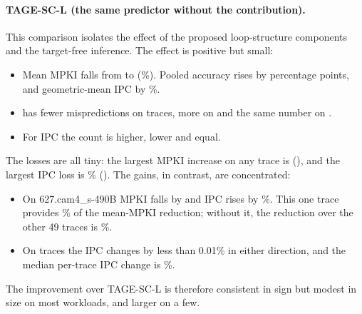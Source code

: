 \paragraph{TAGE-SC-L (the same predictor without the contribution).} This comparison isolates the effect of the proposed loop-structure components and the target-free inference. The effect is positive but small:
\begin{itemize}
\item Mean MPKI falls from  to  (\%). Pooled accuracy rises by  percentage points, and geometric-mean IPC by \%.
\item \prop{} has fewer mispredictions on  traces, more on  and the same number on .
\item For IPC the count is  higher,  lower and  equal.
\end{itemize}
The losses are all tiny: the largest MPKI increase on any trace is  (), and the largest IPC loss is \% (). The gains, in contrast, are concentrated:
\begin{itemize}
\item On 627.cam4\_s-490B MPKI falls by  and IPC rises by \%. This one trace provides \% of the mean-MPKI reduction; without it, the reduction over the other 49 traces is \%.
\item On  traces the IPC changes by less than 0.01\% in either direction, and the median per-trace IPC change is \%.
\end{itemize}
The improvement over TAGE-SC-L is therefore consistent in sign but modest in size on most workloads, and larger on a few.
